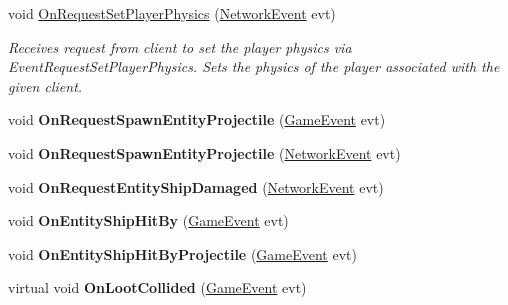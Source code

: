 \begin{DoxyCompactItemize}
void \hyperlink{class_skyrates_1_1_server_1_1_network_1_1_client_server_ab12fc7b88d98e13c6ea6bd00badde39f}{On\-Request\-Set\-Player\-Physics} (\hyperlink{class_skyrates_1_1_common_1_1_network_1_1_event_1_1_network_event}{Network\-Event} evt)
\begin{DoxyCompactList}\small\item\em Receives request from client to set the player physics via Event\-Request\-Set\-Player\-Physics. Sets the physics of the player associated with the given client. \end{DoxyCompactList}\item 
\hypertarget{class_skyrates_1_1_server_1_1_network_1_1_client_server_a49c44061421a811ab338e27f2ab46ed3}{void {\bfseries On\-Request\-Spawn\-Entity\-Projectile} (\hyperlink{class_skyrates_1_1_client_1_1_game_1_1_event_1_1_game_event}{Game\-Event} evt)}\label{class_skyrates_1_1_server_1_1_network_1_1_client_server_a49c44061421a811ab338e27f2ab46ed3}

\item 
\hypertarget{class_skyrates_1_1_server_1_1_network_1_1_client_server_a7c651e02a480935105cfb169f68395b4}{void {\bfseries On\-Request\-Spawn\-Entity\-Projectile} (\hyperlink{class_skyrates_1_1_common_1_1_network_1_1_event_1_1_network_event}{Network\-Event} evt)}\label{class_skyrates_1_1_server_1_1_network_1_1_client_server_a7c651e02a480935105cfb169f68395b4}

\item 
\hypertarget{class_skyrates_1_1_server_1_1_network_1_1_client_server_a6391f98a3985073546d38b4523eca432}{void {\bfseries On\-Request\-Entity\-Ship\-Damaged} (\hyperlink{class_skyrates_1_1_common_1_1_network_1_1_event_1_1_network_event}{Network\-Event} evt)}\label{class_skyrates_1_1_server_1_1_network_1_1_client_server_a6391f98a3985073546d38b4523eca432}

\item 
\hypertarget{class_skyrates_1_1_server_1_1_network_1_1_client_server_a7e9f838c7e76be903bb2a591c5d3d2f0}{void {\bfseries On\-Entity\-Ship\-Hit\-By} (\hyperlink{class_skyrates_1_1_client_1_1_game_1_1_event_1_1_game_event}{Game\-Event} evt)}\label{class_skyrates_1_1_server_1_1_network_1_1_client_server_a7e9f838c7e76be903bb2a591c5d3d2f0}

\item 
\hypertarget{class_skyrates_1_1_server_1_1_network_1_1_client_server_a0e87759acd9e27ba50d11645b54ce662}{void {\bfseries On\-Entity\-Ship\-Hit\-By\-Projectile} (\hyperlink{class_skyrates_1_1_client_1_1_game_1_1_event_1_1_game_event}{Game\-Event} evt)}\label{class_skyrates_1_1_server_1_1_network_1_1_client_server_a0e87759acd9e27ba50d11645b54ce662}

\item 
\hypertarget{class_skyrates_1_1_server_1_1_network_1_1_client_server_ad30e4dc5b1b1e385e3bffd7d45aa6b43}{virtual void {\bfseries On\-Loot\-Collided} (\hyperlink{class_skyrates_1_1_client_1_1_game_1_1_event_1_1_game_event}{Game\-Event} evt)}\label{class_skyrates_1_1_server_1_1_network_1_1_client_server_ad30e4dc5b1b1e385e3bffd7d45aa6b43}

\end{DoxyCompactItemize}
